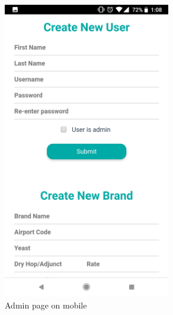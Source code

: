 \documentclass[draftclsnofoot,onecolumn,letterpaper,10pt,compsoc]{IEEEtran}
\begin{document}
\begin{figure}
	\centering
	\includegraphics[height=13cm]{screenshots/mobile/admin.png}
  \caption{Admin page on mobile}
\end{figure}
\end{document}
